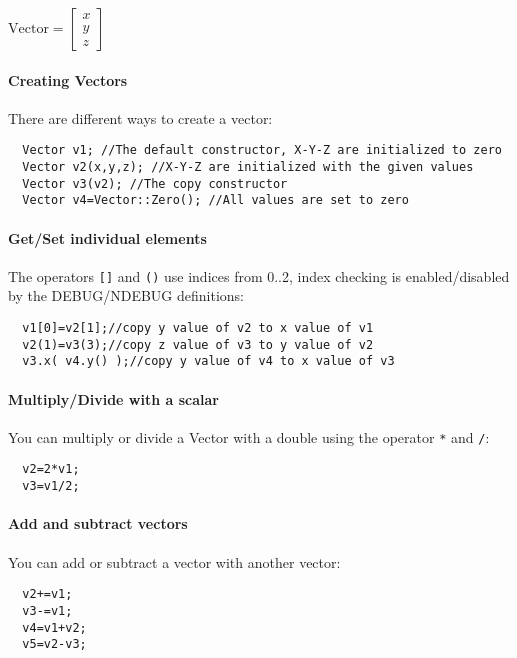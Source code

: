 \documentclass[a4paper,10pt]{report}
\begin{document}
$\mathrm{Vector} = \left[\begin{array}{c} x \\ y \\ z \end{array} \right]$

\paragraph{Creating Vectors}
\label{sec:creating-vectors}
There are different ways to create a vector:
\begin{lstlisting}
  Vector v1; //The default constructor, X-Y-Z are initialized to zero
  Vector v2(x,y,z); //X-Y-Z are initialized with the given values
  Vector v3(v2); //The copy constructor
  Vector v4=Vector::Zero(); //All values are set to zero
\end{lstlisting}

\paragraph{Get/Set individual elements}
\label{sec:gets-indiv-elem}
The operators \lstinline$[]$ and \lstinline$()$ use indices from 0..2,
index checking is enabled/disabled by the DEBUG/NDEBUG definitions:
\begin{lstlisting}
  v1[0]=v2[1];//copy y value of v2 to x value of v1 
  v2(1)=v3(3);//copy z value of v3 to y value of v2
  v3.x( v4.y() );//copy y value of v4 to x value of v3
\end{lstlisting}

\paragraph{Multiply/Divide with a scalar}
\label{sec:mult-with-scal}
You can multiply or divide a Vector with a double using the operator
\lstinline$*$ and \lstinline$/$:
\begin{lstlisting}
  v2=2*v1;
  v3=v1/2;
\end{lstlisting}

\paragraph{Add and subtract vectors}
\label{sec:add-subtract-vectors}
You can add or subtract a vector with another vector:
\begin{lstlisting}
  v2+=v1;
  v3-=v1;
  v4=v1+v2;
  v5=v2-v3;
\end{lstlisting}
\end{document}
